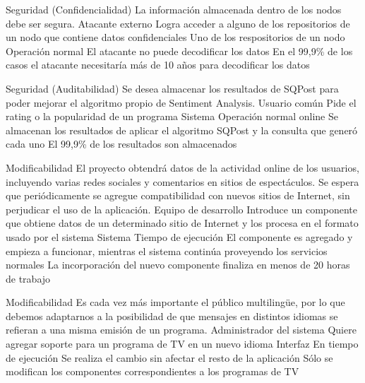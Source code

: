 \begin{enumerate}
\QA
  {Seguridad (Confidencialidad)} %
  {La información almacenada dentro de los nodos debe ser segura.} %
  {Atacante externo} %
  {Logra acceder a alguno de los repositorios de un nodo que contiene datos confidenciales} %
  {Uno de los respositorios de un nodo} %
  {Operación normal} %
  {El atacante no puede decodificar los datos} %
  {En el 99,9\% de los casos el atacante necesitaría más de 10 años para decodificar los datos} %

\QA
  {Seguridad (Auditabilidad)} %
  {Se desea almacenar los resultados de SQPost para poder mejorar el algoritmo propio de Sentiment Analysis.} %
  {Usuario común} %
  {Pide el rating o la popularidad de un programa} %
  {Sistema} %
  {Operación normal online} %
  {Se almacenan los resultados de aplicar el algoritmo SQPost y la consulta que generó cada uno} %
  {El 99,9\% de los resultados son almacenados} %



\QA
  {Modificabilidad} %
  {El proyecto obtendrá datos de la actividad online de los usuarios, incluyendo varias redes sociales y comentarios en sitios de espectáculos. Se espera que periódicamente se agregue compatibilidad con nuevos sitios de Internet, sin perjudicar el uso de la aplicación.} %
  {Equipo de desarrollo} %
  {Introduce un componente que obtiene datos de un determinado sitio de Internet y los procesa en el formato usado por el sistema} %
  {Sistema} %
  {Tiempo de ejecución} %
  {El componente es agregado y empieza a funcionar, mientras el sistema continúa proveyendo los servicios normales} %
  {La incorporación del nuevo componente finaliza en menos de 20 horas de trabajo} %

\QA
  {Modificabilidad} %
  {Es cada vez más importante el público multilingüe, por lo que debemos adaptarnos a la posibilidad de que mensajes en distintos idiomas se refieran a una misma emisión de un programa.} %
  {Administrador del sistema} %
  {Quiere agregar soporte para un programa de TV en un nuevo idioma} %
  {Interfaz} %
  {En tiempo de ejecución} %
  {Se realiza el cambio sin afectar el resto de la aplicación} %
  {Sólo se modifican los componentes correspondientes a los programas de TV} %


\end{enumerate}
